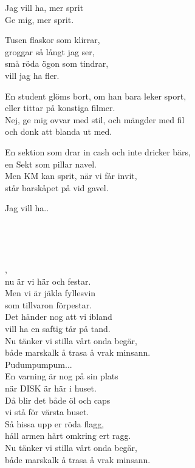 \leftrepeat Jag vill ha, mer sprit\\ 
Ge mig, mer sprit. \rightrepeat

Tusen flaskor som klirrar,\\ 
groggar så långt jag ser,\\ 
små röda ögon som tindrar,\\ 
vill jag ha fler.

En student glöms bort, om han bara leker sport,\\ 
eller tittar på konstiga filmer.\\ 
Nej, ge mig ovvar med stil, och mängder med fil\\ 
och donk att blanda ut med. 

En sektion som drar in cash och inte dricker bärs,\\ 
en Sekt som pillar navel.\\ 
Men KM kan sprit, när vi får invit,\\ 
står barskåpet på vid gavel.

Jag vill ha..

 \\

\newpage 


 \\       
\author{Text: Karin Holm och Sara von Knorring}

,\\
nu är vi här och festar.\\
Men vi är jäkla fyllesvin\\
som tillvaron förpestar.\\
Det händer nog att vi ibland\\
vill ha en saftig tår på tand.\\
Nu tänker vi stilla vårt onda begär,\\
både marskalk å trasa å vrak minsann.\\
Pudumpumpum...\\
En varning är nog på sin plats\\
när DISK är här i huset.\\
Då blir det både öl och caps\\
vi stå för värsta buset.\\
Så hissa upp er röda flagg,\\
håll armen hårt omkring ert ragg.\\
Nu tänker vi stilla vårt onda begär,\\
både marskalk å trasa å vrak minsann.

